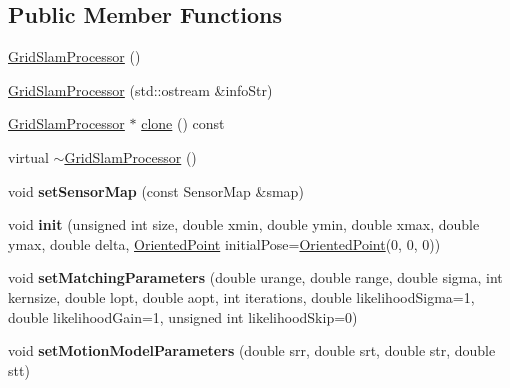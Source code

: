 \subsection*{Public Member Functions}
\begin{DoxyCompactItemize}
\item 
\hyperlink{classGMapping_1_1GridSlamProcessor_a736f647e15e7b3e5f853920beb7b2b80}{Grid\+Slam\+Processor} ()
\item 
\hyperlink{classGMapping_1_1GridSlamProcessor_acccb98ea4c54b844acf14d7ec979e8a8}{Grid\+Slam\+Processor} (std\+::ostream \&info\+Str)
\item 
\hyperlink{classGMapping_1_1GridSlamProcessor}{Grid\+Slam\+Processor} $\ast$ \hyperlink{classGMapping_1_1GridSlamProcessor_a2e5270f6e87161189f19e5880db792ca}{clone} () const
\item 
virtual \hyperlink{classGMapping_1_1GridSlamProcessor_a5cc821f920af1f0e5b6f6c06a5281d35}{$\sim$\+Grid\+Slam\+Processor} ()
\item 
\mbox{\label{classGMapping_1_1GridSlamProcessor_a4277d04a56f1d03deecddcd3f62bf58d}} 
void {\bfseries set\+Sensor\+Map} (const Sensor\+Map \&smap)
\item 
\mbox{\label{classGMapping_1_1GridSlamProcessor_a0993feeb34469143808a6ff2d9d1ae6b}} 
void {\bfseries init} (unsigned int size, double xmin, double ymin, double xmax, double ymax, double delta, \hyperlink{structGMapping_1_1orientedpoint}{Oriented\+Point} initial\+Pose=\hyperlink{structGMapping_1_1orientedpoint}{Oriented\+Point}(0, 0, 0))
\item 
\mbox{\label{classGMapping_1_1GridSlamProcessor_ac015894484817bd962b0990fa64abfe4}} 
void {\bfseries set\+Matching\+Parameters} (double urange, double range, double sigma, int kernsize, double lopt, double aopt, int iterations, double likelihood\+Sigma=1, double likelihood\+Gain=1, unsigned int likelihood\+Skip=0)
\item 
\mbox{\label{classGMapping_1_1GridSlamProcessor_af5c4b7f2992f1d11b2e373dbd410cab2}} 
void {\bfseries set\+Motion\+Model\+Parameters} (double srr, double srt, double str, double stt)
\item 
\mbox{\label{classGMapping_1_1GridSlamProcessor_a82a12db62b99cf2f0cd3f475c81af77f}} 

\end{DoxyCompactItemize}
